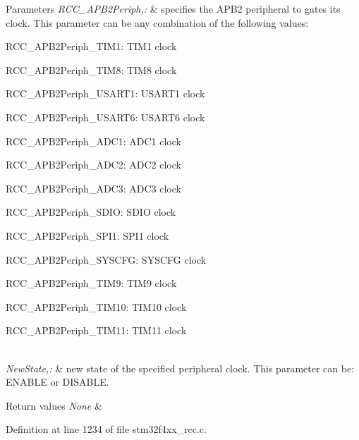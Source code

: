 \begin{DoxyParams}{Parameters}
{\em R\-C\-C\-\_\-\-A\-P\-B2\-Periph,\-:} & specifies the A\-P\-B2 peripheral to gates its clock. This parameter can be any combination of the following values\-: \begin{DoxyItemize}
\item R\-C\-C\-\_\-\-A\-P\-B2\-Periph\-\_\-\-T\-I\-M1\-: T\-I\-M1 clock \item R\-C\-C\-\_\-\-A\-P\-B2\-Periph\-\_\-\-T\-I\-M8\-: T\-I\-M8 clock \item R\-C\-C\-\_\-\-A\-P\-B2\-Periph\-\_\-\-U\-S\-A\-R\-T1\-: U\-S\-A\-R\-T1 clock \item R\-C\-C\-\_\-\-A\-P\-B2\-Periph\-\_\-\-U\-S\-A\-R\-T6\-: U\-S\-A\-R\-T6 clock \item R\-C\-C\-\_\-\-A\-P\-B2\-Periph\-\_\-\-A\-D\-C1\-: A\-D\-C1 clock \item R\-C\-C\-\_\-\-A\-P\-B2\-Periph\-\_\-\-A\-D\-C2\-: A\-D\-C2 clock \item R\-C\-C\-\_\-\-A\-P\-B2\-Periph\-\_\-\-A\-D\-C3\-: A\-D\-C3 clock \item R\-C\-C\-\_\-\-A\-P\-B2\-Periph\-\_\-\-S\-D\-I\-O\-: S\-D\-I\-O clock \item R\-C\-C\-\_\-\-A\-P\-B2\-Periph\-\_\-\-S\-P\-I1\-: S\-P\-I1 clock \item R\-C\-C\-\_\-\-A\-P\-B2\-Periph\-\_\-\-S\-Y\-S\-C\-F\-G\-: S\-Y\-S\-C\-F\-G clock \item R\-C\-C\-\_\-\-A\-P\-B2\-Periph\-\_\-\-T\-I\-M9\-: T\-I\-M9 clock \item R\-C\-C\-\_\-\-A\-P\-B2\-Periph\-\_\-\-T\-I\-M10\-: T\-I\-M10 clock \item R\-C\-C\-\_\-\-A\-P\-B2\-Periph\-\_\-\-T\-I\-M11\-: T\-I\-M11 clock \end{DoxyItemize}
\\
\hline
{\em New\-State,\-:} & new state of the specified peripheral clock. This parameter can be\-: E\-N\-A\-B\-L\-E or D\-I\-S\-A\-B\-L\-E. \\
\hline
\end{DoxyParams}

\begin{DoxyRetVals}{Return values}
{\em None} & \\
\hline
\end{DoxyRetVals}


Definition at line 1234 of file stm32f4xx\-\_\-rcc.\-c.

